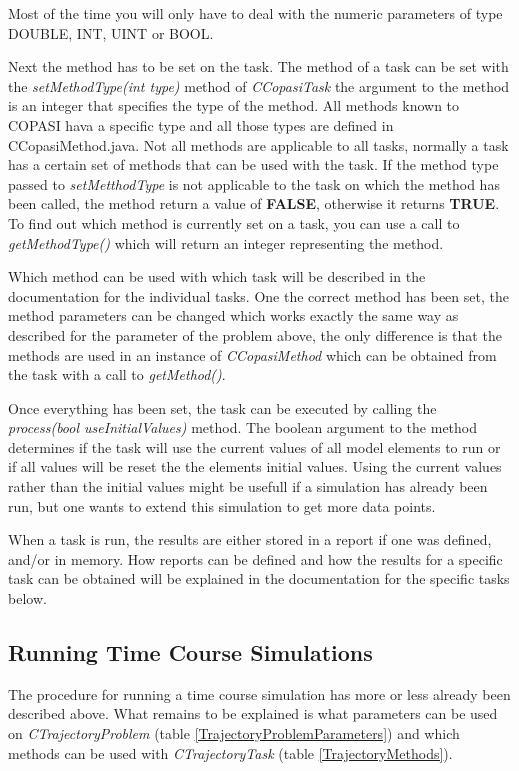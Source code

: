 \documentclass[a4,12pt]{article}
\begin{document}
Most of the time you will only have to deal with the numeric parameters of type DOUBLE, INT, UINT or BOOL.

Next the method has to be set on the task. The method of a task can be set with the \textit{setMethodType(int type)} method of \textit{CCopasiTask} the argument to the method is an integer that specifies the type of the method. All methods known to COPASI hava a specific type and all those types are defined in CCopasiMethod.java. Not all methods are applicable to all tasks, normally a task has a certain set of methods that can be used with the task. If the method type passed to \textit{setMetthodType} is not applicable to the task on which the method has been called, the method return a value of \textbf{FALSE}, otherwise it returns \textbf{TRUE}.
To find out which method is currently set on a task, you can use a call to \textit{getMethodType()} which will return an integer representing the method.

Which method can be used with which task will be described in the documentation for the individual tasks.
One the correct method has been set, the method parameters can be changed which works exactly the same way as described for the parameter of the problem above, the only difference is that the methods are used in an instance of \textit{CCopasiMethod} which can be obtained from the task with a call to \textit{getMethod()}.

Once everything has been set, the task can be executed by calling the \textit{process(bool useInitialValues)} method. The boolean argument to the method determines if the task will use the current values of all model elements to run or if all values will be reset the the elements initial values. Using the current values rather than the initial values might be usefull if a simulation has already been run, but one wants to extend this simulation to get more data points.

When a task is run, the results are either stored in a report if one was defined, and/or in memory. How reports can be defined and how the results for a specific task can be obtained will be explained in the documentation for the specific tasks below.


\subsection{Running Time Course Simulations}
The procedure for running a time course simulation has more or less already been described above. 
What remains to be explained is what parameters can be used on \textit{CTrajectoryProblem} (table \ref{TrajectoryProblemParameters}) and which methods can be used with \textit{CTrajectoryTask} (table \ref{TrajectoryMethods}).
\end{document}
